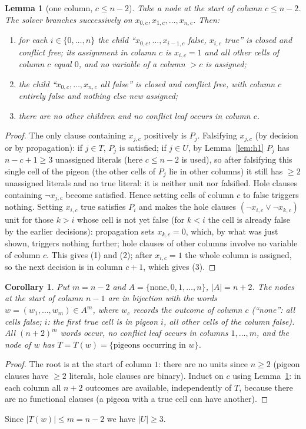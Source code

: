 \documentclass[11pt]{article}
\newtheorem{lemma}{Lemma}
\newtheorem{corollary}{Corollary}
\theoremstyle{definition}
\theoremstyle{remark}
\begin{document}
\begin{lemma}[one column, $c\le n-2$]\label{lem:h2}
Take a node at the start of column $c\le n-2$. The solver branches successively on
$x_{0,c},x_{1,c},\dots,x_{n,c}$. Then:
\begin{enumerate}
\item for each $i\in\{0,\dots,n\}$ the child ``$x_{0,c},\dots,x_{i-1,c}$ false, $x_{i,c}$ true'' is
  closed and conflict free; its assignment in column $c$ is $x_{i,c}=1$ and all other cells of column
  $c$ equal $0$, and no variable of a column $>c$ is assigned;
\item the child ``$x_{0,c},\dots,x_{n,c}$ all false'' is closed and conflict free, with column $c$
  entirely false and nothing else new assigned;
\item there are no other children and no conflict leaf occurs in column $c$.
\end{enumerate}
\end{lemma}
\begin{proof}
The only clause containing $x_{j,c}$ positively is $P_j$. Falsifying $x_{j,c}$ (by decision or by
propagation): if $j\in T$, $P_j$ is satisfied; if $j\in U$, by Lemma~\ref{lem:h1} $P_j$ has
$n-c+1\ge3$ unassigned literals (here $c\le n-2$ is used), so after falsifying this single cell of the
pigeon (the other cells of $P_j$ lie in other columns) it still has $\ge2$ unassigned literals and no
true literal: it is neither unit nor falsified. Hole clauses containing $\neg x_{j,c}$ become satisfied.
Hence setting cells of column $c$ to false triggers nothing. Setting $x_{i,c}$ true satisfies $P_i$ and
makes the hole clauses $(\neg x_{i,c}\vee\neg x_{k,c})$ unit for those $k>i$ whose cell is not yet
false (for $k<i$ the cell is already false by the earlier decisions): propagation sets $x_{k,c}=0$,
which, by what was just shown, triggers nothing further; hole clauses of other columns involve no
variable of column $c$. This gives (1) and (2); after $x_{i,c}=1$ the whole column is assigned, so the
next decision is in column $c{+}1$, which gives (3).
\end{proof}

\begin{corollary}\label{cor:h3}
Put $m=n-2$ and $A=\{\text{none},0,1,\dots,n\}$, $|A|=n+2$. The nodes at the start of column $n-1$ are in
bijection with the words $w=(w_1,\dots,w_m)\in A^m$, where $w_c$ records the outcome of column $c$
(``none'': all cells false; $i$: the first true cell is in pigeon $i$, all other cells of the column
false). All $(n+2)^m$ words occur, no conflict leaf occurs in columns $1,\dots,m$, and the node of $w$
has $T=T(w)=\{\text{pigeons occurring in }w\}$.
\end{corollary}
\begin{proof}
The root is at the start of column $1$: there are no units since $n\ge2$ (pigeon clauses have $\ge2$
literals, hole clauses are binary). Induct on $c$ using Lemma~\ref{lem:h2}: in each column all $n+2$
outcomes are available, independently of $T$, because there are no functional clauses (a pigeon with a
true cell can have another).
\end{proof}
Since $|T(w)|\le m=n-2$ we have $|U|\ge3$.
\end{document}

